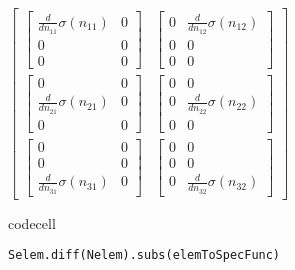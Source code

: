 $\displaystyle \left[\begin{matrix}\left[\begin{matrix}\frac{d}{d n_{11}} \sigma{\left(n_{11} \right)} & 0\\0 & 0\\0 & 0\end{matrix}\right] & \left[\begin{matrix}0 & \frac{d}{d n_{12}} \sigma{\left(n_{12} \right)}\\0 & 0\\0 & 0\end{matrix}\right]\\\left[\begin{matrix}0 & 0\\\frac{d}{d n_{21}} \sigma{\left(n_{21} \right)} & 0\\0 & 0\end{matrix}\right] & \left[\begin{matrix}0 & 0\\0 & \frac{d}{d n_{22}} \sigma{\left(n_{22} \right)}\\0 & 0\end{matrix}\right]\\\left[\begin{matrix}0 & 0\\0 & 0\\\frac{d}{d n_{31}} \sigma{\left(n_{31} \right)} & 0\end{matrix}\right] & \left[\begin{matrix}0 & 0\\0 & 0\\0 & \frac{d}{d n_{32}} \sigma{\left(n_{32} \right)}\end{matrix}\right]\end{matrix}\right]$

codecell

\begin{verbatim}
Selem.diff(Nelem).subs(elemToSpecFunc)
\end{verbatim}

